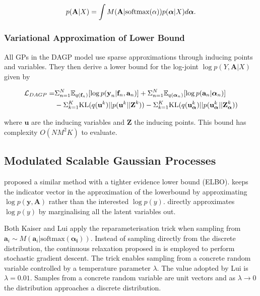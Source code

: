 \documentclass[12pt,a4paper]{report}
\theoremstyle{definition}
\begin{document}
\begin{equation}
	\centering 
	p(\textbf{A} | X) = \int M(\textbf{A} | \textrm{softmax}({\alpha})) p(\boldsymbol{\alpha} | X) d\boldsymbol{\alpha}.
\end{equation}

\subsubsection{Variational Approximation of Lower Bound}

All GPs in the DAGP model use sparse approximations through inducing points and variables.
They then derive a lower bound for the log-joint $\log p(Y, \textbf{A} | X)$ given by

\begin{equation}
	\begin{aligned}
		\centering
		\mathcal{L}_{DAGP} = &\Sigma_{n=1}^{N} \mathbb{E}_{q(\textbf{f}_{n})} [\log p(\textbf{y}_{n} | \textbf{f}_{n}, \textbf{a}_{n})]  + \Sigma_{n=1}^{N} \mathbb{E}_{q(\boldsymbol{\alpha}_{n})} [\log p(\textbf{a}_{n} | \boldsymbol{\alpha}_{n})]  \\
		&- \Sigma_{k=1}^{K} \textrm{KL}(q(\textbf{u}^k) || p(\textbf{u}^k || \textbf{Z}^k)) - \Sigma_{k=1}^{K} \textrm{KL}(q(\textbf{u}_{\boldsymbol{\alpha}}^k) || p(\textbf{u}_{\boldsymbol{\alpha}}^k || \textbf{Z}_{\boldsymbol{\alpha}}^k))
	\end{aligned}
\end{equation}

where $\textbf{u}$ are the inducing variables and $\textbf{Z}$ the inducing points.
This bound has complexity $O(NM^2K)$ to evaluate.

\subsection{Modulated Scalable Gaussian Processes}

\citet{Lui2021} proposed a similar method with a tighter evidence lower bound (ELBO).
\citet{Kaiser2020} keeps the indicator vector in the approximation of the lowerbound by approximating $\log p(\textbf{y}, \textbf{A})$ rather than the interested $\log p(y)$.
\citet{Lui2021} directly approximates $\log p(y)$ by marginalising all the latent variables out.

Both Kaiser and Lui apply the reparameterisation trick when sampling from $\textbf{a}_{i} \sim M(\textbf{a}_{i} | \textrm{softmax}(\boldsymbol{\alpha_{i}}))$. 
Instead of sampling directly from the discrete distribution, the continuous relaxation proposed in \citet{Maddison2017} is employed to perform stochastic gradient descent. 
The trick enables sampling from a concrete random variable controlled by a temperature parameter $\lambda$.
The value adopted by Lui is $\lambda = 0.01$.
Samples from a concrete random variable are unit vectors and as $\lambda \longrightarrow 0$ the distribution approaches a discrete distribution.
\end{document}
